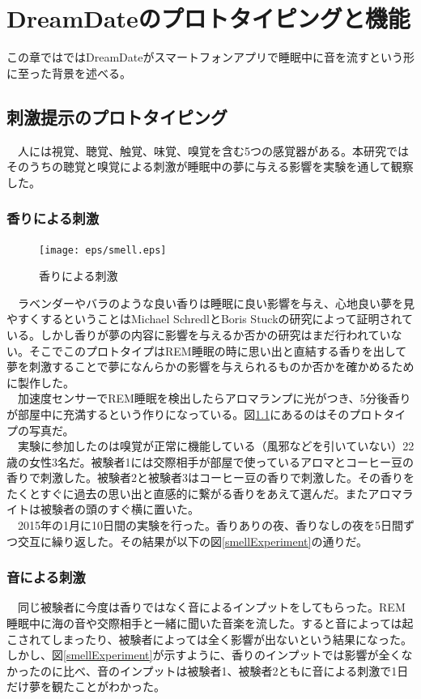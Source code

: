 \chapter{DreamDateのプロトタイピングと機能}
\label{chap:search}

この章ではではDreamDateがスマートフォンアプリで睡眠中に音を流すという形に至った背景を述べる。

\section{刺激提示のプロトタイピング}
　人には視覚、聴覚、触覚、味覚、嗅覚を含む5つの感覚器がある。本研究ではそのうちの聴覚と嗅覚による刺激が睡眠中の夢に与える影響を実験を通して観察した。

\subsection{香りによる刺激}
\begin{figure}[htbp]
\begin{center}
\texttt{[image: eps/smell.eps]}
\caption{香りによる刺激}
\label{smell}
\end{center}
\end{figure}

　ラベンダーやバラのような良い香りは睡眠に良い影響を与え、心地良い夢を見やすくするということはMichael SchredlとBoris Stuckの研究によって証明されている\cite{roseDream}。しかし香りが夢の内容に影響を与えるか否かの研究はまだ行われていない。そこでこのプロトタイプはREM睡眠の時に思い出と直結する香りを出して夢を刺激することで夢になんらかの影響を与えられるものか否かを確かめるために製作した。\\
　加速度センサーでREM睡眠を検出したらアロマランプに光がつき、5分後香りが部屋中に充満するという作りになっている。図\ref{smell}にあるのはそのプロトタイプの写真だ。\\
　実験に参加したのは嗅覚が正常に機能している（風邪などを引いていない）22歳の女性3名だ。被験者1には交際相手が部屋で使っているアロマとコーヒー豆の香りで刺激した。被験者2と被験者3はコーヒー豆の香りで刺激した。その香りをたくとすぐに過去の思い出と直感的に繋がる香りをあえて選んだ。またアロマライトは被験者の頭のすぐ横に置いた。\\
　2015年の1月に10日間の実験を行った。香りありの夜、香りなしの夜を5日間ずつ交互に繰り返した。その結果が以下の図\ref{smellExperiment}の通りだ。

\subsection{音による刺激}
　同じ被験者に今度は香りではなく音によるインプットをしてもらった。REM睡眠中に海の音や交際相手と一緒に聞いた音楽を流した。すると音によっては起こされてしまったり、被験者によっては全く影響が出ないという結果になった。しかし、図\ref{smellExperiment}が示すように、香りのインプットでは影響が全くなかったのに比べ、音のインプットは被験者1、被験者2ともに音による刺激で1日だけ夢を観たことがわかった。

